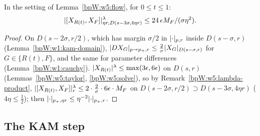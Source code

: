 \begin{lemma}[Commutators]\label{bpW:w5:commutator}
In the setting of Lemma~\ref{bpW:w5:flow}, for $0\le t\le1$:
\[\lvert [X_{R(t)},X_F]\rvert^\lambda_{\eta r,D(s-3\sigma,4\eta r)}\le24\,\epsilon M_F/(\sigma\eta^2).\]
\end{lemma}
\begin{proof}
\label{stepW:w5:k-cauchy} On $D(s-2\sigma,r/2)$, which has margin $\sigma/2$ in $\lvert \cdot\rvert_{p,r}$ inside
$D(s-\sigma,r)$ (Lemma~\ref{bpW:w1:kam-domain}), $\lvert DX_G\rvert_{p\to p_+,r}\le\frac2\sigma\lvert X_G\rvert_{D(s-\sigma,r)}$ for
$G\in\{R(t),F\}$, and the same for parameter differences (Lemma~\ref{bpW:w1:cauchy}).
\label{stepW:w5:k-bd} $\lvert X_{R(t)}\rvert^\lambda\le\max(3\epsilon,6\epsilon)$ on $D(s,r)$
(Lemmas~\ref{bpW:w5:taylor}, \ref{bpW:w5:solve}), so by Remark~\ref{bpW:w5:lambda-product},
$\lvert [X_{R(t)},X_F]\rvert^\lambda_{r}\le2\cdot\frac2\sigma\cdot6\epsilon\cdot M_F$ on $D(s-2\sigma,r/2)\supset D(s-3\sigma,4\eta r)$
($4\eta\le\frac12$); then $\lvert \cdot\rvert_{p_+,\eta r}\le\eta^{-2}\lvert \cdot\rvert_{p_+,r}$.
\end{proof}

\subsection{The KAM step}\label{bpW:w5:step-sec}

